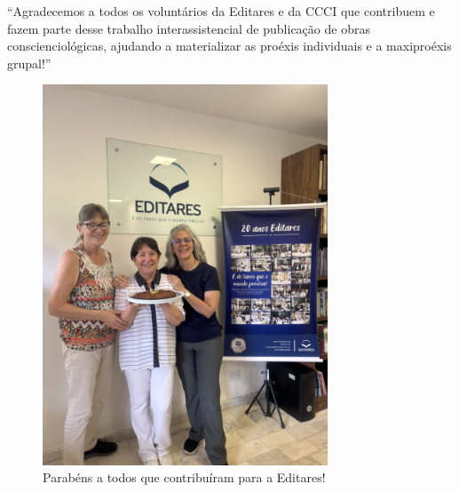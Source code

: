 \documentclass{gescons}
\begin{document}
\begin{multicols}{2}

\begin{pullquote}
``Agradecemos a todos os voluntários da Editares e da CCCI que contribuem e fazem parte desse trabalho interassistencial de publicação de obras conscienciológicas, ajudando a materializar as proéxis individuais e a maxiproéxis grupal!''
\end{pullquote}





        
    \end{multicols}

\begin{center}
    
    
\end{center}


\begin{figure}[h] %
\centering %
\includegraphics[width=8.5cm,trim={0 0 0 60},clip]{articles/resumo/fotos/gestao/IMG_1282.JPEG}
\caption*{Parabéns a todos que contribuíram para a Editares!} %
\end{figure}
\end{document}
